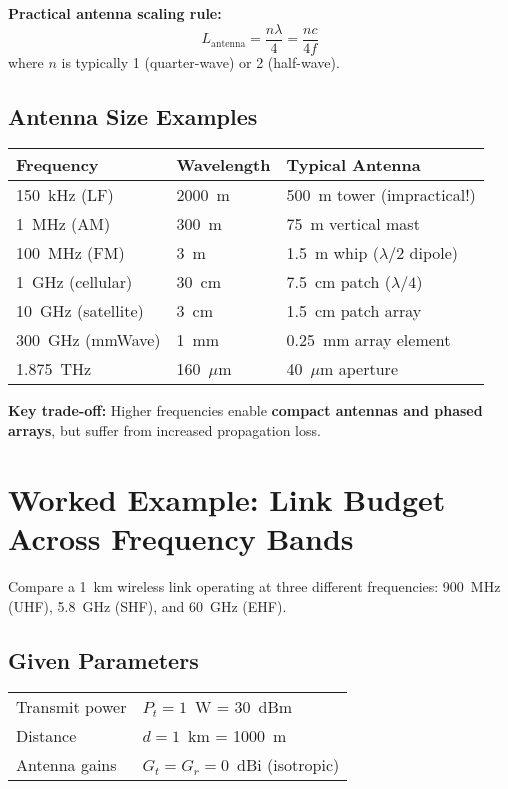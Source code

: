 \textbf{Practical antenna scaling rule:}
\begin{equation}
L_{\text{antenna}} = \frac{n\lambda}{4} = \frac{nc}{4f}
\end{equation}
where $n$ is typically 1 (quarter-wave) or 2 (half-wave).

\subsection{Antenna Size Examples}

\begin{center}
\begin{tabular}{@{}lll@{}}
\toprule
\textbf{Frequency} & \textbf{Wavelength} & \textbf{Typical Antenna} \\
\midrule
150~kHz (LF) & 2000~m & 500~m tower (impractical!) \\
1~MHz (AM) & 300~m & 75~m vertical mast \\
100~MHz (FM) & 3~m & 1.5~m whip ($\lambda/2$ dipole) \\
1~GHz (cellular) & 30~cm & 7.5~cm patch ($\lambda/4$) \\
10~GHz (satellite) & 3~cm & 1.5~cm patch array \\
300~GHz (mmWave) & 1~mm & 0.25~mm array element \\
1.875~THz & 160~$\mu$m & 40~$\mu$m aperture \\
\bottomrule
\end{tabular}
\end{center}

\textbf{Key trade-off:} Higher frequencies enable \textbf{compact antennas and phased arrays}, but suffer from increased propagation loss.

\section{Worked Example: Link Budget Across Frequency Bands}

Compare a 1~km wireless link operating at three different frequencies: 900~MHz (UHF), 5.8~GHz (SHF), and 60~GHz (EHF).

\subsection*{Given Parameters}

\begin{tabular}{@{}ll@{}}
Transmit power & $P_t = 1$~W = 30~dBm \\
Distance & $d = 1$~km = 1000~m \\
Antenna gains & $G_t = G_r = 0$~dBi (isotropic) \\
\end{tabular}

